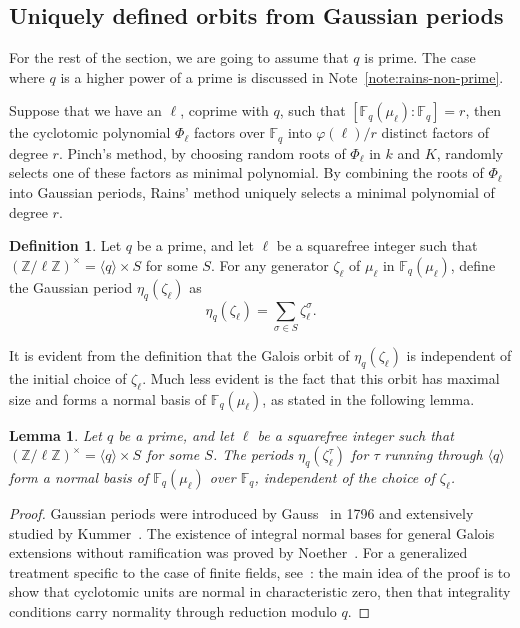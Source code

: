 \documentclass{mcom-l}
\theoremstyle{plain}
\newtheorem{lemma}[theorem]{Lemma}
\theoremstyle{definition}
\newtheorem{definition}[theorem]{Definition}
\newcommand{\Z}{\ensuremath{\mathbb{Z}}}
\newcommand{\F}{\ensuremath{\mathbb{F}}}
\newcommand{\euler}{\ensuremath{\varphi}}
\begin{document}
\subsection{Uniquely defined orbits from Gaussian periods}

For the rest of the section, we are going to assume that $q$ is
prime. The case where $q$ is a higher power of a prime is discussed in
Note~\ref{note:rains-non-prime}.

Suppose that we have an $\ell$, coprime with $q$, such that
$[\F_q(\mu_\ell):\F_q]=r$, then the cyclotomic polynomial $\Phi_\ell$
factors over $\F_q$ into $\euler(\ell)/r$ distinct factors of degree
$r$. Pinch's method, by choosing random roots of $\Phi_\ell$ in $k$
and $K$, randomly selects one of these factors as minimal polynomial.
By combining the roots of $\Phi_\ell$ into Gaussian periods, Rains'
method uniquely selects a minimal polynomial of degree $r$.

\begin{definition}
  Let $q$ be a prime, and let $\ell$ be a squarefree integer such that
  $(\Z/\ell\Z)^\times = \langle q\rangle \times S$ for some $S$.  For any
  generator $\zeta_\ell$ of $\mu_\ell$ in $\F_q(\mu_\ell)$, define the
  Gaussian period $\eta_q(\zeta_\ell)$ as
  \begin{equation}
    \eta_q(\zeta_\ell) = \sum_{\sigma\in S}{\zeta_\ell^{\sigma}}.
  \end{equation}
\end{definition}

It is evident from the definition that the Galois orbit of
$\eta_q(\zeta_\ell)$ is independent of the initial choice of
$\zeta_\ell$. Much less evident is the fact that this orbit has
maximal size and forms a normal basis of $\F_q(\mu_\ell)$, as stated
in the following lemma.

\begin{lemma}
  \label{th:gaussian}
  Let $q$ be a prime, and let $\ell$ be a squarefree integer such that
  $(\Z/\ell\Z)^\times = \langle q\rangle \times S$ for some $S$.  The
  periods $\eta_q(\zeta_\ell^\tau)$ for $\tau$ running through
  $\langle q\rangle$ form a normal basis of $\F_q(\mu_\ell)$ over
  $\F_q$, independent of the choice of $\zeta_\ell$.
\end{lemma}
\begin{proof}
  Gaussian periods were introduced by Gauss~\cite{gauss1986disquisitiones} in 1796 and extensively studied by Kummer~\cite{Kummer1846,Kummer1847a,Kummer1847b,Kummer1847c,Kummer1851,Kummer1855,Kummer1857}.
  The existence of integral normal bases for general Galois extensions without ramification was proved by Noether~\cite{Noether1932}.
  For a generalized treatment specific to the case of finite fields, see~\cite[Main Theorem]{feisel1999normal}:
  the main idea of the proof is to show that cyclotomic units are
  normal in characteristic zero, then that integrality conditions
  carry normality through reduction modulo $q$.
\end{proof}
\end{document}
